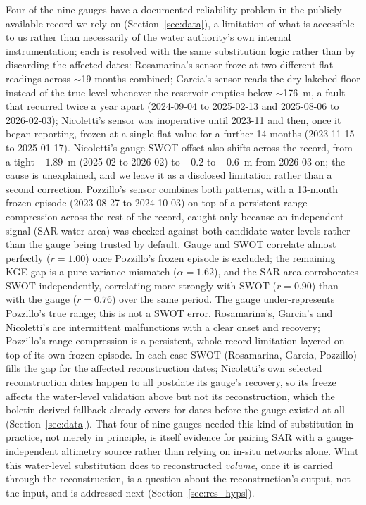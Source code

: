 Four of the nine gauges have a documented reliability problem in the publicly available
record we rely on (Section~\ref{sec:data}), a limitation of what is accessible to us rather
than necessarily of the water authority's own internal instrumentation; each is resolved with
the same substitution logic rather than by discarding the affected dates: Rosamarina's sensor
froze at two different flat readings across
$\sim$19 months combined; Garcia's sensor reads the dry lakebed floor instead of the true level
whenever the reservoir empties below $\sim$176~m, a fault that recurred twice a year apart
(2024-09-04 to 2025-02-13 and 2025-08-06 to 2026-02-03); Nicoletti's sensor was inoperative
until 2023-11 and then, once it began reporting, frozen at a single flat value for a further 14
months (2023-11-15 to 2025-01-17). Nicoletti's gauge-SWOT offset also shifts across the record,
from a tight $-1.89$~m (2025-02 to 2026-02) to $-0.2$ to $-0.6$~m from 2026-03 on; the cause is
unexplained, and we leave it as a disclosed limitation rather than a second correction. Pozzillo's
sensor combines both patterns, with a 13-month frozen episode (2023-08-27 to 2024-10-03) on top
of a persistent range-compression across the rest of the record, caught only because an
independent signal (SAR water area) was checked against both candidate water levels rather than
the gauge being trusted by default. Gauge and SWOT correlate almost perfectly ($r=1.00$) once
Pozzillo's frozen episode is excluded; the remaining KGE gap is a pure variance mismatch
($\alpha=1.62$), and the SAR area corroborates SWOT independently, correlating more strongly
with SWOT ($r=0.90$) than with the gauge ($r=0.76$) over the same period. The gauge under-represents
Pozzillo's true range; this is not a SWOT error. Rosamarina's, Garcia's and Nicoletti's are
intermittent malfunctions with a clear onset and recovery; Pozzillo's range-compression is a
persistent, whole-record limitation layered on top of its own frozen episode. In
each case SWOT (Rosamarina, Garcia, Pozzillo) fills the gap for the affected reconstruction
dates; Nicoletti's own selected reconstruction dates happen to all postdate its gauge's
recovery, so its freeze affects the water-level validation above but not its reconstruction,
which the boletin-derived fallback already covers for dates before the gauge existed at all
(Section~\ref{sec:data}). That four of nine gauges needed this kind of substitution in
practice, not merely in principle, is itself evidence for pairing SAR with a gauge-independent
altimetry source rather than relying on in-situ networks alone. What this water-level
substitution does to reconstructed \emph{volume}, once it is carried through the
reconstruction, is a question about the reconstruction's output, not the input, and is
addressed next (Section~\ref{sec:res_hyps}).

